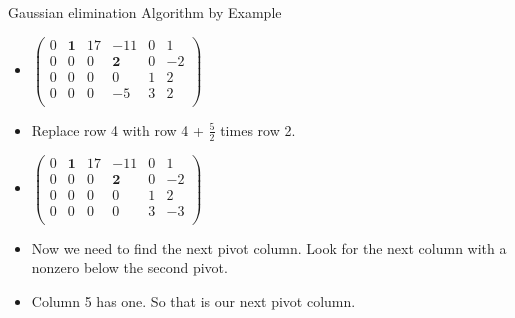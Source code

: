 \documentclass{beamer}
\begin{document}
\begin{frame}{Gaussian elimination Algorithm by Example}

\begin{itemize}
\item $
\begin{pmatrix}
0 & \textbf{1} &  17   &          -11   &  0  &  1  \\
0 &         0  &   0   &   \textbf{2}   &  0  &  -2 \\
0 &         0  &   0   &           0    &  1  &  2 \\
0 &         0  &   0   &          -5    &  3  &  2 \\
\end{pmatrix}
$
\item Replace row 4 with row 4 + $\frac{5}{2}$ times row 2.
\item $
\begin{pmatrix}
0 & \textbf{1} &  17   &          -11   &  0  &   1  \\
0 &         0  &   0   &   \textbf{2}   &  0  &  -2  \\
0 &         0  &   0   &           0    &  1  &   2  \\
0 &         0  &   0   &           0    &  3  &   -3  \\
\end{pmatrix}
$
\item Now we need to find the next pivot column. Look for the
next column with a nonzero below the second pivot.
\item Column 5 has one. So that is our next pivot column.
\end{itemize}
\end{frame}

\end{document}

